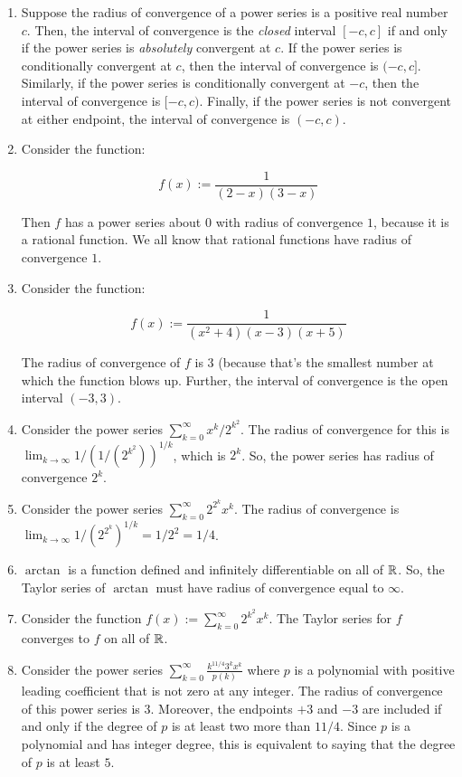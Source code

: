 \documentclass[10pt]{amsart}
\begin{document}
\begin{enumerate}
\item Suppose the radius of convergence of a power series is a
  positive real number $c$. Then, the interval of convergence is the
  {\em closed} interval $[-c,c]$ if and only if the power series is
  {\em absolutely} convergent at $c$. If the power series is
  conditionally convergent at $c$, then the interval of convergence is
  $(-c,c]$. Similarly, if the power series is conditionally convergent
  at $-c$, then the interval of convergence is $[-c,c)$. Finally, if
  the power series is not convergent at either endpoint, the interval
  of convergence is $(-c,c)$.

\item Consider the function:

  $$f(x) := \frac{1}{(2 - x)(3 - x)}$$

  Then $f$ has a power series about $0$ with radius of convergence
  $1$, because it is a rational function. We all know that rational
  functions have radius of convergence $1$.

\item Consider the function:

  $$f(x) := \frac{1}{(x^2 + 4)(x - 3)(x + 5)}$$

  The radius of convergence of $f$ is $3$ (because that's the smallest
  number at which the function blows up. Further, the interval of
  convergence is the open interval $(-3,3)$.

\item Consider the power series $\sum_{k=0}^\infty x^k/2^{k^2}$. The
  radius of convergence for this is $\lim_{k \to \infty}
  1/(1/(2^{k^2}))^{1/k}$, which is $2^k$. So, the power series has radius of
  convergence $2^k$.
\item Consider the power series $\sum_{k=0}^\infty 2^{2^k}x^k$. The
  radius of convergence is $\lim_{k \to \infty} 1/(2^{2^k})^{1/k} =
  1/2^2 = 1/4$.
\item $\arctan$ is a function defined and infinitely differentiable on
  all of $\mathbb{R}$. So, the Taylor series of $\arctan$ must have radius of
  convergence equal to $\infty$.
\item Consider the function $f(x) := \sum_{k=0}^\infty
  2^{k^2}x^k$. The Taylor series for $f$ converges to $f$ on all of
  $\mathbb{R}$.
\item Consider the power series $\sum_{k=0}^\infty
  \frac{k^{11/4}3^kx^k}{p(k)}$ where $p$ is a polynomial with positive
  leading coefficient that is not zero at any integer. The radius of
  convergence of this power series is $3$. Moreover, the endpoints
  $+3$ and $-3$ are included if and only if the degree of $p$ is at
  least two more than $11/4$. Since $p$ is a polynomial and has
  integer degree, this is equivalent to saying that the degree of $p$
  is at least $5$.
\end{enumerate}
\end{document}
